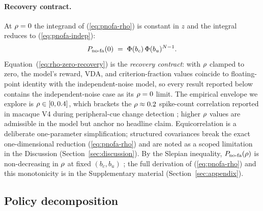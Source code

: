 \paragraph{Recovery contract.}
At $\rho = 0$ the integrand of (\ref{eq:pnofa-rho}) is constant in $z$
and the integral reduces to (\ref{eq:pnofa-indep}):
\begin{equation}
  P_{\mathrm{no\text{-}fa}}(0) \;=\;
  \Phi(b_c)\,\Phi(b_u)^{N - 1}.
  \label{eq:rho-zero-recovery}
\end{equation}
Equation~(\ref{eq:rho-zero-recovery}) is the \emph{recovery contract}:
with $\rho$ clamped to zero, the model's reward, VDA, and
criterion-fraction values coincide to floating-point identity with the
independent-noise model, so every result reported below contains the
independent-noise case as its $\rho = 0$ limit. The empirical envelope
we explore is $\rho \in [0, 0.4]$, which brackets the $\rho \approx 0.2$
spike-count correlation reported in macaque V4 during peripheral-cue
change detection \cite{CohenMaunsell2009}; higher $\rho$ values are
admissible in the model but anchor no headline claim. Equicorrelation is
a deliberate one-parameter simplification; structured covariances
\cite{RuffCohen2016, Srinath2021} break the exact one-dimensional
reduction (\ref{eq:pnofa-rho}) and are noted as a scoped limitation in
the Discussion (Section~\ref{sec:discussion}). By the Slepian
inequality, $P_{\mathrm{no\text{-}fa}}(\rho)$ is non-decreasing in $\rho$ at fixed
$(b_c, b_u)$ \cite{Slepian1962}; the full derivation of
(\ref{eq:pnofa-rho}) and this monotonicity is in the Supplementary
material (Section~\ref{sec:appendix}).

\subsection{Policy decomposition}
\label{sec:model-policies}


